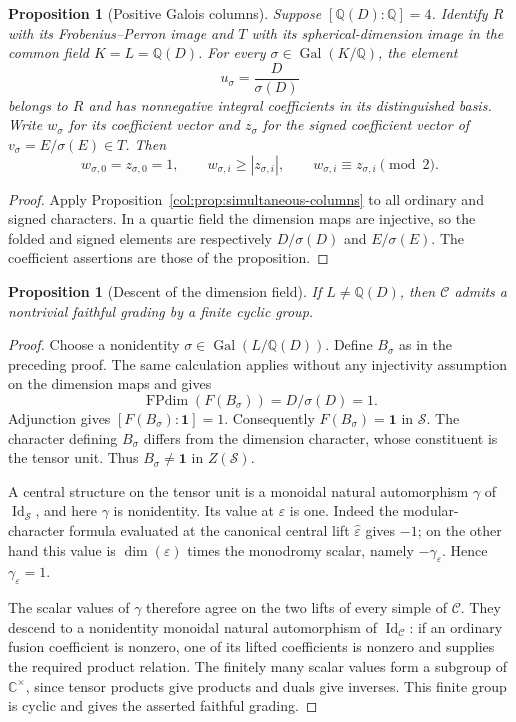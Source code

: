 \documentclass[11pt,a4paper]{article}
\newtheorem{proposition}[theorem]{Proposition}
\theoremstyle{definition}\newtheorem{definition}[theorem]{Definition}
\theoremstyle{remark}\newtheorem{remark}[theorem]{Remark}
\newcommand{\C}{\mathcal C}
\newcommand{\Q}{\mathbb Q}
\newcommand{\CC}{\mathbb C}
\numberwithin{equation}{section}
\begin{document}
\begin{proposition}[Positive Galois columns]\label{col:prop:positive-Galois-columns}
Suppose $[\Q(D):\Q]=4$. Identify $R$ with
its Frobenius--Perron image and $T$ with its spherical-dimension
image in the common field $K=L=\Q(D)$. For every
$\sigma\in\operatorname{Gal}(K/\Q)$, the element
\[
 u_\sigma=\frac{D}{\sigma(D)}
\]
belongs to $R$ and has nonnegative integral coefficients in its
distinguished basis. Write $w_\sigma$ for its coefficient vector and
$z_\sigma$ for the signed coefficient vector of
$v_\sigma=E/\sigma(E)\in T$. Then
\[
 w_{\sigma,0}=z_{\sigma,0}=1,\qquad
 w_{\sigma,i}\ge |z_{\sigma,i}|,\qquad
 w_{\sigma,i}\equiv z_{\sigma,i}\pmod2.
\]
\end{proposition}
\begin{proof}
Apply Proposition~\ref{col:prop:simultaneous-columns} to all ordinary
and signed characters. In a quartic field the dimension maps are
injective, so the folded and signed elements are respectively
$D/\sigma(D)$ and $E/\sigma(E)$. The coefficient assertions are
those of the proposition.
\end{proof}

\begin{proposition}[Descent of the dimension field]\label{col:prop:dimension-field-grading}
If $L\ne\Q(D)$, then $\C$ admits a nontrivial
faithful grading by a finite cyclic group.
\end{proposition}
\begin{proof}
Choose a nonidentity $\sigma\in\operatorname{Gal}(L/\Q(D))$.
Define $B_\sigma$ as in the preceding proof. The same
calculation applies without any injectivity assumption on the
dimension maps and gives
\[
 \operatorname{FPdim}(F(B_\sigma))=D/\sigma(D)=1.
\]
Adjunction gives $[F(B_\sigma):\mathbf1]=1$. Consequently
$F(B_\sigma)=\mathbf1$ in $\mathcal S$. The character defining
$B_\sigma$ differs from the dimension character, whose constituent
is the tensor unit. Thus $B_\sigma\ne\mathbf1$ in $Z(\mathcal S)$.

A central structure on the tensor unit is a monoidal natural
automorphism $\gamma$ of $\operatorname{Id}_{\mathcal S}$, and here
$\gamma$ is nonidentity. Its value at $\varepsilon$ is one.
Indeed the modular-character formula evaluated at the canonical
central lift $\widehat\varepsilon$ gives $-1$; on the other hand
this value is $\dim(\varepsilon)$ times the monodromy scalar,
namely $-\gamma_\varepsilon$. Hence
$\gamma_\varepsilon=1$.

The scalar values of $\gamma$ therefore agree on the two lifts of
every simple of $\C$. They descend to a nonidentity
monoidal natural automorphism of $\operatorname{Id}_{\C}$:
if an ordinary fusion coefficient is nonzero, one of its lifted
coefficients is nonzero and supplies the required product relation.
The finitely many scalar values form a subgroup of $\CC^\times$,
since tensor products give products and duals give inverses. This
finite group is cyclic and gives the asserted faithful grading.
\end{proof}
\end{document}
